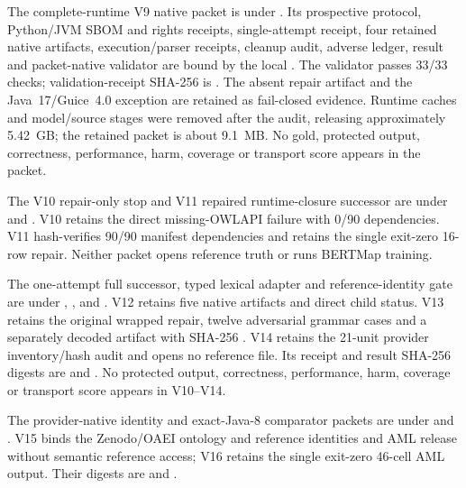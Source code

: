 The complete-runtime V9 native packet is under
. Its prospective
protocol, Python/JVM SBOM and rights receipts, single-attempt receipt, four
retained native artifacts, execution/parser receipts, cleanup audit, adverse
ledger, result and packet-native validator are bound by the local
. The validator passes 33/33 checks; validation-receipt SHA-256
is
.
The absent repair artifact and the Java~17/Guice~4.0 exception are retained as
fail-closed evidence. Runtime caches and model/source stages were removed after
the audit, releasing approximately 5.42~GB; the retained packet is about
9.1~MB. No gold, protected output, correctness, performance, harm, coverage or
transport score appears in the packet.

The V10 repair-only stop and V11 repaired runtime-closure successor are under
 and
. V10 retains the
direct missing-OWLAPI failure with 0/90 dependencies. V11 hash-verifies 90/90
manifest dependencies and retains the single exit-zero 16-row repair. Neither
packet opens reference truth or runs BERTMap training.

The one-attempt full successor, typed lexical adapter and reference-identity
gate are under ,
, and
. V12 retains
five native artifacts and direct child status. V13 retains the original wrapped
repair, twelve adversarial grammar cases and a separately decoded artifact with
SHA-256
.
V14 retains the 21-unit provider inventory/hash audit and opens no reference
file. Its receipt and result SHA-256 digests are
and
.
No protected output, correctness, performance, harm, coverage or transport
score appears in V10--V14.

The provider-native identity and exact-Java-8 comparator packets are under
 and
. V15
binds the Zenodo/OAEI ontology and reference identities and AML release without
semantic reference access; V16 retains the single exit-zero 46-cell AML output.
Their  digests are
and
.

